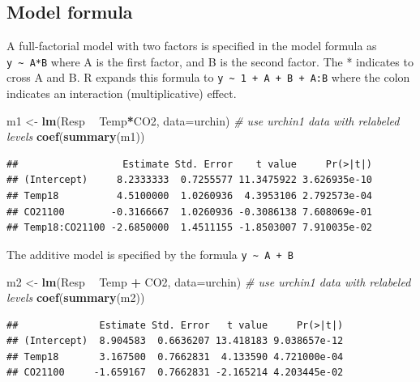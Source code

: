 \documentclass[]{book}
\newenvironment{Shaded}{\begin{snugshade}}{\end{snugshade}}
\newcommand{\CommentTok}[1]{\textcolor[rgb]{0.56,0.35,0.01}{\textit{#1}}}
\newcommand{\DataTypeTok}[1]{\textcolor[rgb]{0.13,0.29,0.53}{#1}}
\newcommand{\KeywordTok}[1]{\textcolor[rgb]{0.13,0.29,0.53}{\textbf{#1}}}
\newcommand{\NormalTok}[1]{#1}
\newcommand{\OperatorTok}[1]{\textcolor[rgb]{0.81,0.36,0.00}{\textbf{#1}}}
\newcommand{\StringTok}[1]{\textcolor[rgb]{0.31,0.60,0.02}{#1}}
\begin{document}
\hypertarget{model-formula}{%
\subsection{Model formula}\label{model-formula}}

A full-factorial model with two factors is specified in the model formula as \texttt{y\ \textasciitilde{}\ A*B} where A is the first factor, and B is the second factor. The * indicates to cross A and B. R expands this formula to \texttt{y\ \textasciitilde{}\ 1\ +\ A\ +\ B\ +\ A:B} where the colon indicates an interaction (multiplicative) effect.

\begin{Shaded}
\begin{Highlighting}[]
\NormalTok{m1 <-}\StringTok{ }\KeywordTok{lm}\NormalTok{(Resp }\OperatorTok{~}\StringTok{ }\NormalTok{Temp}\OperatorTok{*}\NormalTok{CO2, }\DataTypeTok{data=}\NormalTok{urchin) }\CommentTok{# use urchin1 data with relabeled levels}
\KeywordTok{coef}\NormalTok{(}\KeywordTok{summary}\NormalTok{(m1))}
\end{Highlighting}
\end{Shaded}

\begin{verbatim}
##                  Estimate Std. Error    t value     Pr(>|t|)
## (Intercept)     8.2333333  0.7255577 11.3475922 3.626935e-10
## Temp18          4.5100000  1.0260936  4.3953106 2.792573e-04
## CO21100        -0.3166667  1.0260936 -0.3086138 7.608069e-01
## Temp18:CO21100 -2.6850000  1.4511155 -1.8503007 7.910035e-02
\end{verbatim}

The additive model is specified by the formula \texttt{y\ \textasciitilde{}\ A\ +\ B}

\begin{Shaded}
\begin{Highlighting}[]
\NormalTok{m2 <-}\StringTok{ }\KeywordTok{lm}\NormalTok{(Resp }\OperatorTok{~}\StringTok{ }\NormalTok{Temp }\OperatorTok{+}\StringTok{ }\NormalTok{CO2, }\DataTypeTok{data=}\NormalTok{urchin) }\CommentTok{# use urchin1 data with relabeled levels}
\KeywordTok{coef}\NormalTok{(}\KeywordTok{summary}\NormalTok{(m2))}
\end{Highlighting}
\end{Shaded}

\begin{verbatim}
##              Estimate Std. Error   t value     Pr(>|t|)
## (Intercept)  8.904583  0.6636207 13.418183 9.038657e-12
## Temp18       3.167500  0.7662831  4.133590 4.721000e-04
## CO21100     -1.659167  0.7662831 -2.165214 4.203445e-02
\end{verbatim}
\end{document}
